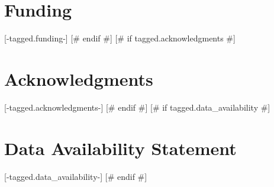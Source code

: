 \documentclass[utf8]{FrontiersinVancouver} %
[# else #]
\begin{document}
\section*{Funding}
[-tagged.funding-]
[# endif #]
[# if tagged.acknowledgments #]
\section*{Acknowledgments}
[-tagged.acknowledgments-]
[# endif #]
[# if tagged.data_availability #]
\section*{Data Availability Statement}
[-tagged.data_availability-]
[# endif #]




\end{document}
